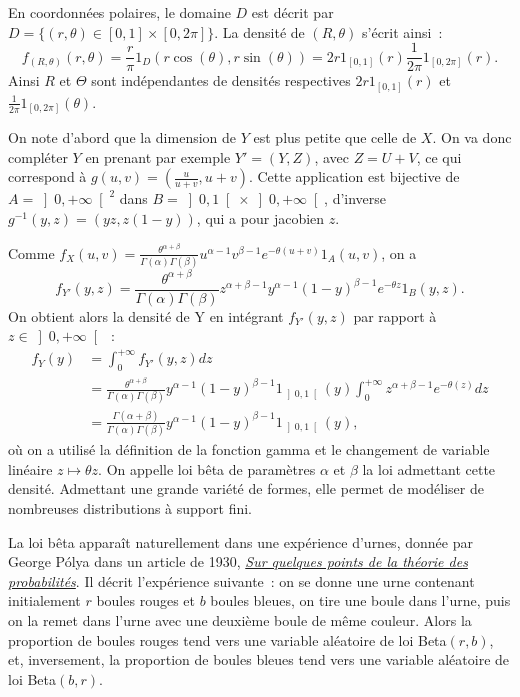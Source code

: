 \label{II-answer-exo-flechetteter}
En coordonnées polaires, le domaine \(D\) est décrit par
\(D = \{(r,\theta) \in [0,1] \times [0,2\pi]\}\). La densité de
\((R,\theta)\) s'écrit ainsi~:
\[f_{(R,\theta)}(r,\theta) = \frac{r}{\pi}1_{D} (r\cos(\theta),r\sin(\theta)) = 2r 1_{[0,1]}(r) \frac{1}{2\pi}1_{[0,2\pi]}(r).\]
Ainsi \(R\) et \(\Theta\) sont indépendantes de densités respectives
\(2r 1_{[0,1]}(r)\) et \(\frac{1}{2\pi}1_{[0,2\pi]}(\theta)\).

\label{II-answer-exo-loibeta}
On note d'abord que la dimension de \(Y\) est plus petite que celle de
\(X\). On va donc compléter \(Y\) en prenant par exemple \(Y' = (Y,Z)\),
avec \(Z=U+V\), ce qui correspond à
\(g(u,v) = \left(\frac{u}{u+v},u+v\right)\). Cette application est
bijective de \(A = \left]0,+\infty\right[^2\) dans
\(B = \left]0,1\right[ \times \left]0,+\infty\right[\), d'inverse
\(g^{-1}(y,z) = (yz,z(1-y))\), qui a pour jacobien \(z\).

Comme
\(f_X(u,v) = \frac{\theta^{\alpha+\beta}}{\Gamma(\alpha)\Gamma(\beta)}u^{\alpha-1}v^{\beta-1}e^{-\theta(u+v)}1_A(u,v)\),
on a
\[f_{Y'}(y,z) = \frac{\theta^{\alpha+\beta}}{\Gamma(\alpha)\Gamma(\beta)}z^{\alpha+\beta -1}y^{\alpha-1}(1-y)^{\beta-1}e^{-\theta z}1_B(y,z).\]
On obtient alors la densité de Y en intégrant \(f_{Y'}(y,z)\) par
rapport à \(z\in \left]0,+\infty\right[\)~: \begin{align*}
f_Y(y) &= \int_0^{+\infty} f_{Y'}(y,z) dz\\
       &= \frac{\theta^{\alpha+\beta}}{\Gamma(\alpha)\Gamma(\beta)}y^{\alpha-1}(1-y)^{\beta-1}1_{\left]0,1\right[}(y)\int_0^{+\infty}z^{\alpha+\beta -1}e^{-\theta(z)}dz\\
       &= \frac{\Gamma(\alpha+\beta)}{\Gamma(\alpha)\Gamma(\beta)}y^{\alpha-1}(1-y)^{\beta-1}1_{\left]0,1\right[}(y),
\end{align*} où on a utilisé la définition de la fonction gamma et le
changement de variable linéaire \(z \mapsto \theta z\). On appelle loi
bêta de paramètres \(\alpha\) et \(\beta\) la loi admettant cette
densité. Admettant une grande variété de formes, elle permet de
modéliser de nombreuses distributions à support fini.

La loi bêta apparaît naturellement dans une expérience d'urnes, donnée
par George Pólya dans un article de 1930,
\href{http://www.numdam.org/article/AIHP_1930__1_2_117_0.pdf}{\emph{Sur
quelques points de la théorie des probabilités}}. Il décrit l'expérience
suivante~: on se donne une urne contenant initialement \(r\) boules
rouges et \(b\) boules bleues, on tire une boule dans l'urne, puis on la
remet dans l'urne avec une deuxième boule de même couleur. Alors la
proportion de boules rouges tend vers une variable aléatoire de loi
Beta\((r,b)\), et, inversement, la proportion de boules bleues tend vers
une variable aléatoire de loi Beta\((b,r)\).

